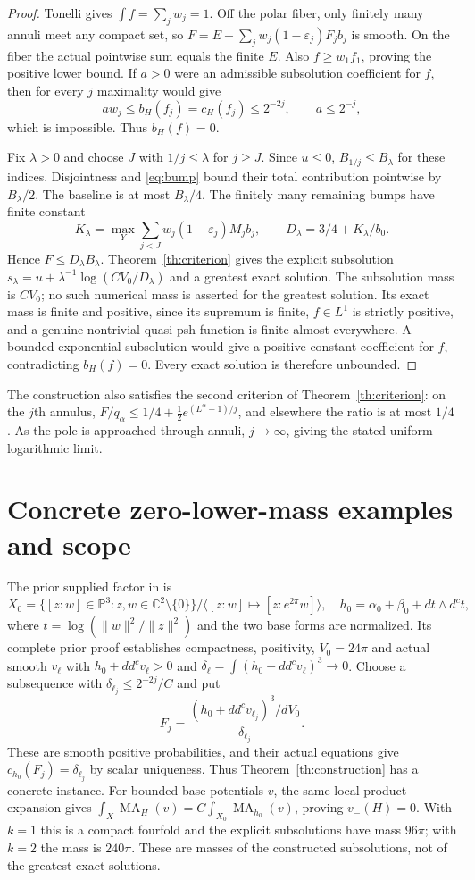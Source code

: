 \documentclass[11pt]{article}
\newcommand{\ddc}{dd^c}
\newcommand{\dc}{d^c}
\newcommand{\MA}{\operatorname{MA}}
\newcommand{\PP}{\mathbb P}
\theoremstyle{remark}\newtheorem{remark}[theorem]{Remark}
\begin{document}
\begin{proof}
Tonelli gives $\int f=\sum_jw_j=1$. Off the polar fiber, only finitely
many annuli meet any compact set, so
$F=E+\sum_jw_j(1-\varepsilon_j)F_jb_j$ is smooth. On the fiber
the actual pointwise sum equals the finite $E$.
Also $f\geq w_1f_1$, proving the positive lower bound.
If $a>0$ were an admissible subsolution coefficient for $f$, then
for every $j$ maximality would give
\[
 aw_j\leq b_H(f_j)=c_H(f_j)\leq2^{-2j},
 \qquad a\leq2^{-j},
\]
which is impossible. Thus $b_H(f)=0$.

Fix $\lambda>0$ and choose $J$ with $1/j\leq\lambda$ for $j\geq J$.
Since $u\leq0$, $B_{1/j}\leq B_\lambda$ for these indices.
Disjointness and \eqref{eq:bump} bound their total contribution
pointwise by $B_\lambda/2$. The baseline is at most $B_\lambda/4$.
The finitely many remaining bumps have finite constant
\[
 K_\lambda=\max_Y\sum_{j<J}w_j(1-\varepsilon_j)M_jb_j,
 \qquad D_\lambda=3/4+K_\lambda/b_0.
\]
Hence $F\leq D_\lambda B_\lambda$.
Theorem~\ref{th:criterion} gives the explicit subsolution
$s_\lambda=u+\lambda^{-1}\log(CV_0/D_\lambda)$ and a greatest
exact solution. The subsolution mass is $CV_0$; no such numerical
mass is asserted for the greatest solution. Its exact mass is finite
and positive, since its supremum is finite, $f\in L^1$ is strictly
positive, and a genuine nontrivial quasi-psh function is finite
almost everywhere. A bounded exponential subsolution would give
a positive constant coefficient for $f$, contradicting $b_H(f)=0$.
Every exact solution is therefore unbounded.
\end{proof}

The construction also satisfies the second criterion of
Theorem~\ref{th:criterion}: on the $j$th annulus,
$F/q_\alpha\leq1/4+\tfrac12 e^{(L^\alpha-1)/j}$, and elsewhere the
ratio is at most $1/4$. As the pole is approached through annuli,
$j\to\infty$, giving the stated uniform logarithmic limit.

\section{Concrete zero-lower-mass examples and scope}
The prior supplied factor in \cite[Appendix]{Product} is
\[
 X_0=\{[z:w]\in\PP^3:z,w\in\mathbb C^2\setminus\{0\}\}
       /\langle[z:w]\mapsto[z:e^{2\pi}w]\rangle,
 \quad h_0=\alpha_0+\beta_0+dt\wedge\dc t,
\]
where $t=\log(\|w\|^2/\|z\|^2)$ and the two base forms are
normalized. Its complete prior proof establishes compactness,
positivity, $V_0=24\pi$ and actual smooth $v_\ell$ with
$h_0+\ddc v_\ell>0$ and
$\delta_\ell=\int(h_0+\ddc v_\ell)^3\to0$.
Choose a subsequence with $\delta_{\ell_j}\leq2^{-2j}/C$ and put
\[
 F_j=\frac{(h_0+\ddc v_{\ell_j})^3/dV_0}{\delta_{\ell_j}}.
\]
These are smooth positive probabilities, and their actual equations
give $c_{h_0}(F_j)=\delta_{\ell_j}$ by scalar uniqueness.
Thus Theorem~\ref{th:construction} has a concrete instance.
For bounded base potentials $v$, the same local product expansion gives
$\int_X\MA_H(v)=C\int_{X_0}\MA_{h_0}(v)$, proving $v_-(H)=0$.
With $k=1$ this is a compact fourfold and the explicit subsolutions
have mass $96\pi$; with $k=2$ the mass is $240\pi$.
These are masses of the constructed subsolutions, not of the greatest
exact solutions.
\end{document}
